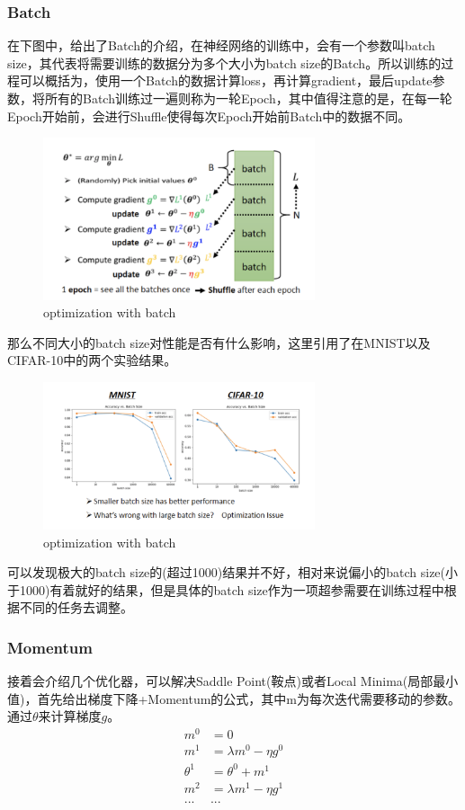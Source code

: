 \documentclass{article}
\begin{document}
\subsubsection{Batch}
\indent  在下图中，给出了Batch的介绍，在神经网络的训练中，会有一个参数叫batch size，其代表将需要训练的数据分为多个大小为batch size的Batch。所以训练的过程可以概括为，使用一个Batch的数据计算loss，再计算gradient，最后update参数，将所有的Batch训练过一遍则称为一轮Epoch，其中值得注意的是，在每一轮Epoch开始前，会进行Shuffle使得每次Epoch开始前Batch中的数据不同。
\begin{figure}[H]
    \centering
    \includegraphics[width=8cm]{picture/Batch.png}
    \caption{optimization with batch}
    \label{fig:galxy}
\end{figure}
\indent 那么不同大小的batch size对性能是否有什么影响，这里引用了在MNIST以及CIFAR-10中的两个实验结果。
\begin{figure}[H]
    \centering
    \includegraphics[width=8cm]{picture/DBatch.png}
    \caption{optimization with batch}
    \label{fig:galxy}
\end{figure}
\indent 可以发现极大的batch size的(超过1000)结果并不好，相对来说偏小的batch size(小于1000)有着就好的结果，但是具体的batch size作为一项超参需要在训练过程中根据不同的任务去调整。\par
\newpage

\subsubsection{Momentum}
\indent 接着会介绍几个优化器，可以解决Saddle Point(鞍点)或者Local Minima(局部最小值)，首先给出梯度下降+Momentum的公式，其中m为每次迭代需要移动的参数。通过\( \theta \)来计算梯度\( g \)。
\begin{align*}
    m^{0} &= 0 \\
    m^{1} &= \lambda m^{0} -  \eta g^{0}\\
    \theta^{1} &= \theta^{0} + m^{1}\\
    m^{2} &= \lambda m^{1} -  \eta g^{1}\\
    ...&...
\end{align*}
\end{document}
